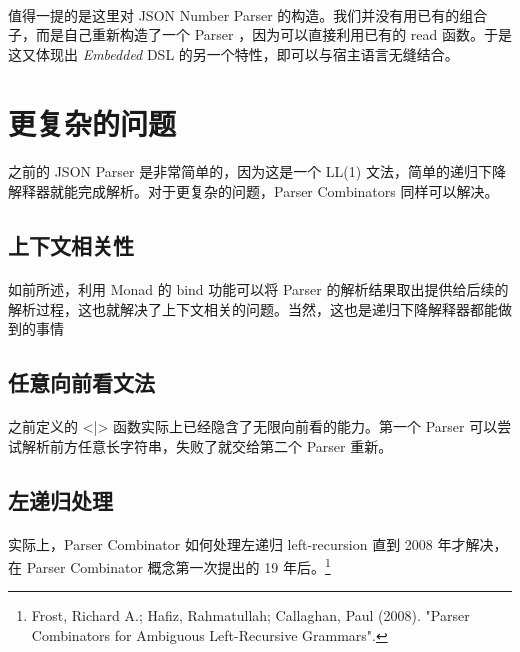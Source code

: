 \documentclass{article}
\begin{document}
   \paragraph{}
    值得一提的是这里对 JSON Number Parser 的构造。我们并没有用已有的组合子，而是自己重新构造了一个 Parser ，因为可以直接利用已有的 read 函数。于是这又体现出 \textit{Embedded} DSL 的另一个特性，即可以与宿主语言无缝结合。
 \section{更复杂的问题}
   \paragraph{}
    之前的 JSON Parser 是非常简单的，因为这是一个 LL(1) 文法，简单的递归下降解释器就能完成解析。对于更复杂的问题，Parser Combinators 同样可以解决。
  \subsection{上下文相关性}
   \paragraph{}
    如前所述，利用 Monad 的 bind 功能可以将 Parser 的解析结果取出提供给后续的解析过程，这也就解决了上下文相关的问题。当然，这也是递归下降解释器都能做到的事情
  \subsection{任意向前看文法}
   \paragraph{}
    之前定义的 <|> 函数实际上已经隐含了无限向前看的能力。第一个 Parser 可以尝试解析前方任意长字符串，失败了就交给第二个 Parser 重新。
  \subsection{左递归处理}
   \paragraph{}
    实际上，Parser Combinator 如何处理左递归 left-recursion 直到 2008 年才解决，在 Parser Combinator 概念第一次提出的 19 年后。\footnote{Frost, Richard A.; Hafiz, Rahmatullah; Callaghan, Paul (2008). "Parser Combinators for Ambiguous Left-Recursive Grammars".}
\end{document}
